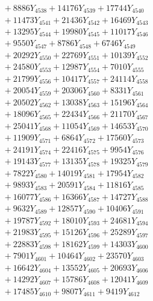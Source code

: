 \documentclass[a4paper,10pt]{article}
\begin{document}
{\begin{align}
&\;  + 8886 Y_{4538} + 14176 Y_{4539} + 17744 Y_{4540} \\[0.3ex]
&\;  + 11473 Y_{4541} + 21436 Y_{4542} + 16469 Y_{4543} \\[0.3ex]
&\;  + 13295 Y_{4544} + 19980 Y_{4545} + 11017 Y_{4546} \\[0.3ex]
&\;  + 9550 Y_{4547} + 8786 Y_{4548} + 6746 Y_{4549} \\[0.3ex]
&\;  + 20292 Y_{4550} + 22769 Y_{4551} + 10139 Y_{4552} \\[0.3ex]
&\;  + 24580 Y_{4553} + 12987 Y_{4554} + 7010 Y_{4555} \\[0.3ex]
&\;  + 21799 Y_{4556} + 10417 Y_{4557} + 24114 Y_{4558} \\[0.5ex]\allowbreak
&\;  + 20054 Y_{4559} + 20306 Y_{4560} + 8331 Y_{4561} \\[0.3ex]
&\;  + 20502 Y_{4562} + 13038 Y_{4563} + 15196 Y_{4564} \\[0.3ex]
&\;  + 18096 Y_{4565} + 22434 Y_{4566} + 21170 Y_{4567} \\[0.3ex]
&\;  + 25041 Y_{4568} + 11054 Y_{4569} + 14653 Y_{4570} \\[0.3ex]
&\;  + 11909 Y_{4571} + 6864 Y_{4572} + 17560 Y_{4573} \\[0.3ex]
&\;  + 24191 Y_{4574} + 22416 Y_{4575} + 9954 Y_{4576} \\[0.3ex]
&\;  + 19143 Y_{4577} + 13135 Y_{4578} + 19325 Y_{4579} \\[0.3ex]
&\;  + 7822 Y_{4580} + 14019 Y_{4581} + 17954 Y_{4582} \\[0.3ex]
&\;  + 9893 Y_{4583} + 20591 Y_{4584} + 11816 Y_{4585} \\[0.3ex]
&\;  + 16077 Y_{4586} + 16366 Y_{4587} + 14727 Y_{4588} \\[0.5ex]\allowbreak
&\;  + 9632 Y_{4589} + 12857 Y_{4590} + 10406 Y_{4591} \\[0.3ex]
&\;  + 19787 Y_{4592} + 18010 Y_{4593} + 24681 Y_{4594} \\[0.3ex]
&\;  + 21983 Y_{4595} + 15126 Y_{4596} + 25289 Y_{4597} \\[0.3ex]
&\;  + 22883 Y_{4598} + 18162 Y_{4599} + 14303 Y_{4600} \\[0.3ex]
&\;  + 7901 Y_{4601} + 10464 Y_{4602} + 23570 Y_{4603} \\[0.3ex]
&\;  + 16642 Y_{4604} + 13552 Y_{4605} + 20693 Y_{4606} \\[0.3ex]
&\;  + 14292 Y_{4607} + 15786 Y_{4608} + 12041 Y_{4609} \\[0.3ex]
&\;  + 17485 Y_{4610} + 9807 Y_{4611} + 9419 Y_{4612} \\[0.3ex]

\end{align}}
\end{document}
